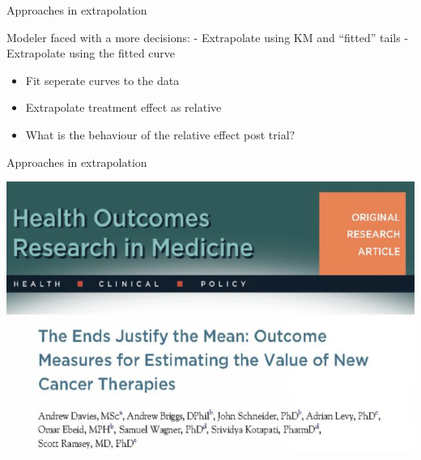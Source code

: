 \documentclass[ignorenonframetext,]{beamer}
\providecommand{\tightlist}{%
  \setlength{\itemsep}{0pt}\setlength{\parskip}{0pt}}
\begin{document}
\begin{frame}{Approaches in extrapolation}

Modeler faced with a more decisions: - Extrapolate using KM and
``fitted'' tails - Extrapolate using the fitted curve

\begin{itemize}
\tightlist
\item
  Fit seperate curves to the data
\item
  Extrapolate treatment effect as relative
\item
  What is the behaviour of the relative effect post trial?
\end{itemize}

\end{frame}

\begin{frame}{Approaches in extrapolation}

\includegraphics[width=1\linewidth]{figures/endmeans}

\end{frame}
\end{document}
